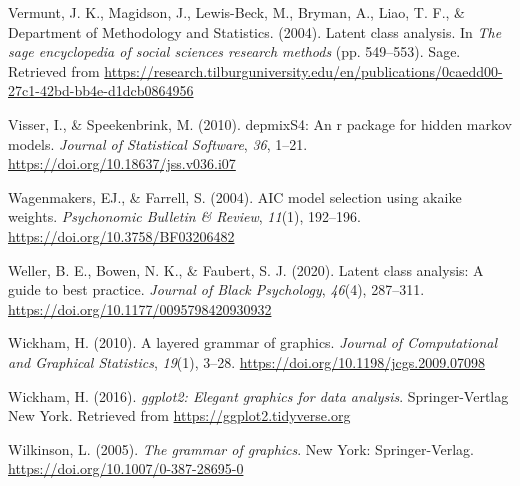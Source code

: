 \documentclass[
  ,man,floatsintext]{apa6}
\newlength{\cslhangindent}
\newlength{\cslentryspacingunit} %
\newenvironment{CSLReferences}[2] %
 {%
  \setlength{\parindent}{0pt}
  \ifodd #1
  \let\oldpar\par
  \def\par{\hangindent=\cslhangindent\oldpar}
  \fi
  \setlength{\parskip}{#2\cslentryspacingunit}
 }%
 {}
\begin{document}
\begin{CSLReferences}{1}{0}
\leavevmode{}%
Vermunt, J. K., Magidson, J., Lewis-Beck, M., Bryman, A., Liao, T. F., \& Department of Methodology and Statistics. (2004). Latent class analysis. In \emph{The sage encyclopedia of social sciences research methods} (pp. 549--553). Sage. Retrieved from \url{https://research.tilburguniversity.edu/en/publications/0caedd00-27c1-42bd-bb4e-d1dcb0864956}

\leavevmode{}%
Visser, I., \& Speekenbrink, M. (2010). {depmixS}4: An r package for hidden markov models. \emph{Journal of Statistical Software}, \emph{36}, 1--21. \url{https://doi.org/10.18637/jss.v036.i07}

\leavevmode{}%
Wagenmakers, EJ., \& Farrell, S. (2004). {AIC} model selection using akaike weights. \emph{Psychonomic Bulletin \& Review}, \emph{11}(1), 192--196. \url{https://doi.org/10.3758/BF03206482}

\leavevmode{}%
Weller, B. E., Bowen, N. K., \& Faubert, S. J. (2020). Latent class analysis: A guide to best practice. \emph{Journal of Black Psychology}, \emph{46}(4), 287--311. \url{https://doi.org/10.1177/0095798420930932}

\leavevmode{}%
Wickham, H. (2010). A layered grammar of graphics. \emph{Journal of Computational and Graphical Statistics}, \emph{19}(1), 3--28. \url{https://doi.org/10.1198/jcgs.2009.07098}

\leavevmode{}%
Wickham, H. (2016). \emph{ggplot2: Elegant graphics for data analysis}. Springer-Vertlag New York. Retrieved from \url{https://ggplot2.tidyverse.org}

\leavevmode{}%
Wilkinson, L. (2005). \emph{The grammar of graphics}. New York: Springer-Verlag. \url{https://doi.org/10.1007/0-387-28695-0}

\end{CSLReferences}
\end{document}
